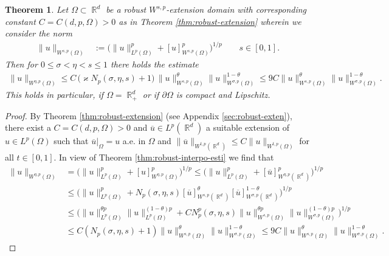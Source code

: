 \documentclass[12pt, reqno]{amsart}%
\theoremstyle{plain}  %
\newtheorem{theorem}{Theorem}[section]
\theoremstyle{definition}  %
\theoremstyle{remark}
\numberwithin{equation}{section}
\DeclareMathOperator{\R}{\mathbb{R}}
\begin{document}
\begin{theorem}\label{thm:robust-interpo-dom}
Let $\Omega \subset \R^d$ be a robust $W^{s,p}$-extension domain with corresponding constant $C = C(d,p,\Omega) > 0$ as in Theorem \ref{thm:robust-extension} wherein we consider the norm
\begin{align*}
\|u\|_{W^{s,p}(\Omega)}&:=  \Big(\|u\|^p_{L^p(\Omega)}+ [u]^p_{W^{s,p}(\Omega)} \Big)^{1/p}\qquad s\in [0,1].
\end{align*}
 Then  for $0\leq\sigma <\eta< s\leq1$ there holds the estimate
\begin{align*}
\|u\|_{W^{\eta,p}(\Omega)}
\leq C\,\big(\varkappa N_p(\sigma,\eta,s)+1\big)\,
\|u\|_{W^{s,p}(\Omega)}^{\theta}
\|u\|_{W^{\sigma,p}(\Omega)}^{1-\theta}\leq 9C
\|u\|_{W^{s,p}(\Omega)}^{\theta}
\|u\|_{W^{\sigma,p}(\Omega)}^{1-\theta}.
\end{align*}
This holds in  particular,  if $\Omega = \R^d_+$ or if $\partial\Omega$ is compact and Lipschitz.
\end{theorem}
\begin{proof}
By Theorem \ref{thm:robust-extension} (see Appendix \ref{sec:robust-exten}), there exist a  $C=C(d,p,\Omega)>0$ and  $\overline{u}\in L^p(\R^d)$ a suitable extension of $u\in L^p(\Omega)$ such that $\overline{u}|_\Omega=u$ a.e. in $\Omega$ and $\|\overline{u}\|_{W^{t, p}(\R^d)}\leq C \|u\|_{W^{t, p}(\Omega)}$ for all $t\in [0,1]$.
 In view of Theorem \ref{thm:robust-interpo-esti} we find that
\begin{align*}
\|u\|_{W^{\eta, p}(\Omega)}
&=\Big(\|u\|^p_{L^p(\Omega)}+ [u]^p_{W^{\eta,p}(\Omega)} \Big)^{1/p}\leq  \Big(\|u\|^p_{L^p(\Omega)}+ [\overline{u}]^p_{W^{\eta,p}(\R^d)} \Big)^{1/p}
\\
&\leq \Big(\|u\|^p_{L^p(\Omega)}+N_p(\sigma, \eta, s)
[\overline{u}]^\theta_{W^{s, p}(\R^d)} [\overline{u}]^{1-\theta}_{W^{\sigma, p}(\R^d)}\Big)^{1/p}\\
&\leq  \Big(\|u\|^{\theta p}_{L^p(\Omega)}\|u\|^{(1-\theta)p}_{L^p(\Omega)}+ CN^p_p(\sigma, \eta, s)\|u\|^{\theta p}_{W^{s, p}(\Omega)}\|u\|^{(1-\theta)p}_{W^{\sigma, p}(\Omega)} \Big)^{1/p}\\
&\leq C(N_p(\sigma, \eta, s)+1)
\|u\|^{\theta }_{W^{s, p}(\Omega)}\|u\|^{1-\theta}_{W^{\sigma, p}(\Omega)} \leq 9C
\|u\|^{\theta }_{W^{s, p}(\Omega)}\|u\|^{1-\theta}_{W^{\sigma, p}(\Omega)}.
\end{align*}
\end{proof}
\end{document}
